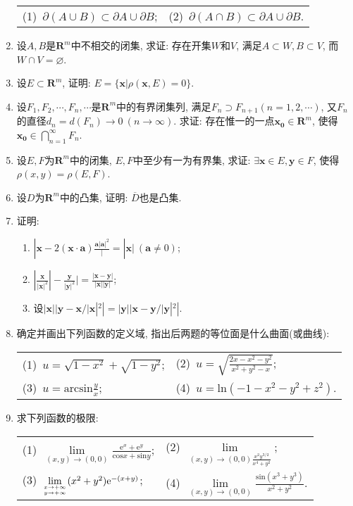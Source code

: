 \begin{enumerate}
\begin{table}[H]
 		\begin{tabular}{ll}
 			(1)\ $\partial(A\cup B)\subset \partial A \cup \partial B$;\qquad \qquad \qquad \qquad \qquad &(2)\ $\partial(A\cap B)\subset \partial A \cup \partial B$. 
 		\end{tabular}
 	\end{table}
 	\item 设$A,B$是$\bm{R}^m$中不相交的闭集, 求证: 存在开集$W$和$V$, 满足$A\subset W, B\subset V$, 而 $W\cap V=\varnothing$.
 	\item 设$E\subset \bm{R}^m$, 证明: $E=\{\bm{x}|\rho(\bm{x},E)=0\}$.
 	\item 设$F_1,F_2,\cdots,F_n,\cdots$是$\bm{R}^m$中的有界闭集列, 满足$F_n \supset F_{n+1}(n=1,2,\cdots)$, 又$F_n$的直径$d_n=d(F_n)\rightarrow 0\ (n\rightarrow \infty)$. 求证: 存在惟一的一点$
 	\bm{x_0}\in \bm{R}^m$, 使得$\bm{x_0}\in \bigcap\limits_{n=1}^{\infty}F_n$.
 	\item 设$E,F$为$\bm{R}^m$中的闭集, $E,F$中至少有一为有界集, 求证: $\exists \bm{x}\in E,\bm{y}\in F$, 使得$\rho(x,y)=\rho(E,F)$.
 	\item 设$D$为$\bm{R}^m$中的凸集, 证明: $\overline{D}$也是凸集.
 	\item 证明:
 	\begin{enumerate}
 		\item $|\bm{x}-2(\bm{x}\cdot \bm{a})\frac{\bm{a}{|\bm{a}|^2}}| = |\bm{x}|\ (\bm{a}\ne 0)$;
		 \item $|\frac{\bm{x}}{|\bm{x}|^2}|-\frac{\bm{y}}{|\bm{y}|^2}| = \frac{|\bm{x}-\bm{y}|}{|\bm{x}||\bm{y}|}$;
		 \item 设$|\bm{x}||\bm{y}-\bm{x}/|\bm{x}|^2|=|\bm{y}||\bm{x}-\bm{y}/|\bm{y}|^2|$.
 	\end{enumerate}
 	\item 确定并画出下列函数的定义域, 指出后两题的等位面是什么曲面(或曲线):
 	\begin{table}[H]
 	\begin{tabular}{ll}
 		(1)\ $u=\sqrt{1-x^2}+\sqrt{1-y^2}$;\qquad \qquad \qquad \qquad \qquad &(2)\ $u=\sqrt{\frac{2x-x^2-y^2}{x^2+y^2-x}}$;\\
 		(3)\ $u=\mathrm{arcsin}\frac{y}{x}$;\qquad  \qquad \qquad \qquad \qquad &(4)\  $u=\mathrm{ln}(-1-x^2-y^2+z^2)$.
 	\end{tabular}	
 	 \end{table}
  \item 求下列函数的极限:
  \begin{table}[H]
  	\begin{tabular}{ll}
  		(1)\ $\lim\limits_{(x,y)\rightarrow (0,0)}\frac{\mathrm{e}^x+\mathrm{e}^y}{\mathrm{cos}x+\mathrm{sin}y}$;\qquad \qquad \qquad \qquad \qquad &(2)\ $\lim\limits_{(x,y)\rightarrow (0,0)\frac{x^2y^{3/2}}{x^4+y^2}}$;\\
  		(3)\ $\lim\limits_{x\rightarrow +\infty \atop y\rightarrow +\infty}(x^2+y^2)\mathrm{e}^{-(x+y)}$;\qquad \qquad \qquad \qquad \qquad &(4)\ $\lim\limits_{(x,y)\rightarrow (0,0)}\frac{\mathrm{sin}(x^3+y^3)}{x^2+y^2}$.
  	\end{tabular}
  \end{table}


\end{enumerate}
